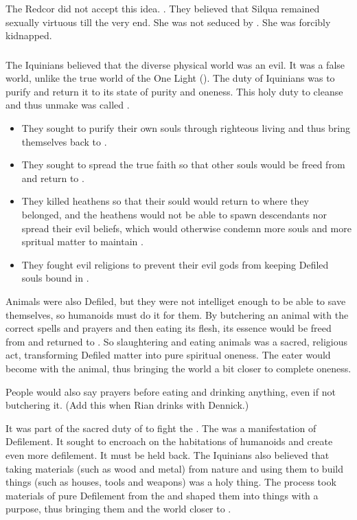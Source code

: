 The Redcor did not accept this idea. 
.
They believed that Silqua remained sexually virtuous till the very end. 
She was not seduced by \Delphine. 
She was forcibly kidnapped. 





\subsubsection{\Tikkun}
The Iquinians believed that the diverse physical world was an evil.
It was a false world, unlike the true world of the One Light (). 
The duty of Iquinians was to purify \Gehinnom and return it to its state of purity and oneness.
This holy duty to cleanse and thus unmake \Gehinnom was called \tikkun.
\begin{itemize}
  \item 
    They sought to purify their own souls through righteous living and thus bring themselves back to \iquin.
  \item 
    They sought to spread the true faith so that other souls would be freed from \Gehinnom and return to \iquin.
  \item 
    They killed heathens so that their sould would return to \itzach where they belonged, and the heathens would not be able to spawn descendants nor spread their evil beliefs, which would otherwise condemn more souls and more spritual matter to maintain \Gehinnom. 
  \item 
    They fought evil religions to prevent their evil gods from keeping Defiled souls bound in \Gehinnom. 
\end{itemize}

Animals were also Defiled, but they were not intelliget enough to be able to save themselves, so humanoids must do it for them.
By butchering an animal with the correct spells and prayers and then eating its flesh, its essence would be freed from \Gehinnom and returned to \iquin. 
So slaughtering and eating animals was a sacred, religious act, transforming Defiled matter into pure spiritual oneness. 
The eater would become  with the animal, thus bringing the world a bit closer to complete oneness.

People would also say prayers before eating and drinking anything, even if not butchering it.
(Add this when Rian drinks with Dennick.)

It was part of the sacred duty of \tikkun to fight the .
The \wylde was a manifestation of Defilement.
It sought to encroach on the habitations of humanoids and create even more defilement.
It must be held back. 
The Iquinians also believed that taking materials (such as wood and metal) from nature and using them to build things (such as houses, tools and weapons) was a holy thing. 
The process took materials of pure Defilement from the \wylde and shaped them into things with a purpose, thus bringing them and the world closer to \iquin. 

